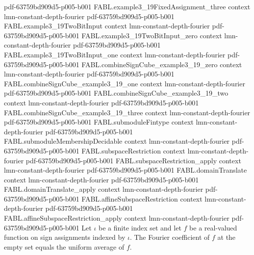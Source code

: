 \begin{theorem}
  {pdf-63759bd909d5-p005-b001}
\proofstep
  {FABL.example3_19FixedAssignment_three}
  {context}
  {lmn-constant-depth-fourier}
  {pdf-63759bd909d5-p005-b001}
\proofstep
  {FABL.example3_19TwoBitInput}
  {context}
  {lmn-constant-depth-fourier}
  {pdf-63759bd909d5-p005-b001}
\proofstep
  {FABL.example3_19TwoBitInput_zero}
  {context}
  {lmn-constant-depth-fourier}
  {pdf-63759bd909d5-p005-b001}
\proofstep
  {FABL.example3_19TwoBitInput_one}
  {context}
  {lmn-constant-depth-fourier}
  {pdf-63759bd909d5-p005-b001}
\proofstep
  {FABL.combineSignCube_example3_19_zero}
  {context}
  {lmn-constant-depth-fourier}
  {pdf-63759bd909d5-p005-b001}
\proofstep
  {FABL.combineSignCube_example3_19_one}
  {context}
  {lmn-constant-depth-fourier}
  {pdf-63759bd909d5-p005-b001}
\proofstep
  {FABL.combineSignCube_example3_19_two}
  {context}
  {lmn-constant-depth-fourier}
  {pdf-63759bd909d5-p005-b001}
\proofstep
  {FABL.combineSignCube_example3_19_three}
  {context}
  {lmn-constant-depth-fourier}
  {pdf-63759bd909d5-p005-b001}
\proofstep
  {FABL.submoduleFintype}
  {context}
  {lmn-constant-depth-fourier}
  {pdf-63759bd909d5-p005-b001}
\proofstep
  {FABL.submoduleMembershipDecidable}
  {context}
  {lmn-constant-depth-fourier}
  {pdf-63759bd909d5-p005-b001}
\proofstep
  {FABL.subspaceRestriction}
  {context}
  {lmn-constant-depth-fourier}
  {pdf-63759bd909d5-p005-b001}
\proofstep
  {FABL.subspaceRestriction_apply}
  {context}
  {lmn-constant-depth-fourier}
  {pdf-63759bd909d5-p005-b001}
\proofstep
  {FABL.domainTranslate}
  {context}
  {lmn-constant-depth-fourier}
  {pdf-63759bd909d5-p005-b001}
\proofstep
  {FABL.domainTranslate_apply}
  {context}
  {lmn-constant-depth-fourier}
  {pdf-63759bd909d5-p005-b001}
\proofstep
  {FABL.affineSubspaceRestriction}
  {context}
  {lmn-constant-depth-fourier}
  {pdf-63759bd909d5-p005-b001}
\proofstep
  {FABL.affineSubspaceRestriction_apply}
  {context}
  {lmn-constant-depth-fourier}
  {pdf-63759bd909d5-p005-b001}
Let $\iota$ be a finite index set and let $f$ be a real-valued function on sign
assignments indexed by $\iota$. The Fourier coefficient of $f$ at the empty set equals
the uniform average of $f$.
\end{theorem}

